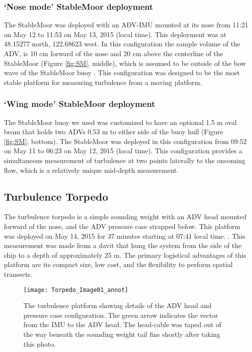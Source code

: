 \subsubsection{`Nose mode' StableMoor deployment}

The StableMoor was deployed with an ADV-IMU mounted at its nose from 11:21 on May 12 to 11:53 on May 13, 2015 (local time). This deployment was at 48.15277 north, 122.68623 west. In this configuration the sample volume of the ADV, is 10 cm forward of the nose and 20 cm above the centerline of the StableMoor (Figure \ref{fig:SM}, middle), which is assumed to be outside of the bow wave of the StableMoor buoy . This configuration was designed to be the most stable platform for measuring turbulence from a moving platform.

\subsubsection{`Wing mode' StableMoor deployment}

The StableMoor buoy we used was customized to have an optional 1.5 m oval beam that holds two ADVs 0.53 m to either side of the buoy hull (Figure \ref{fig:SM}, bottom).  The StableMoor was deployed in this configuration from 09:52 on May 11 to 06:23 on May 12, 2015 (local time). This configuration provides a simultaneous measurement of turbulence at two points laterally to the oncoming flow, which is a relatively unique mid-depth measurement.  

\subsection{Turbulence Torpedo}

The turbulence torpedo is a simple sounding weight with an ADV head mounted forward of the nose, and the ADV pressure case strapped below. This platform was deployed on May 14, 2015 for 37 minutes starting at 07:41 local time. . This measurement was made from a davit that hung the system from the side of the ship to a depth of approximately 25 m. The primary logistical advantages of this platform are its compact size, low cost, and the flexibility to perform spatial transects.  

\begin{figure}[th]
  \centering
  \texttt{[image: Torpedo\_Image01\_annot]}
  \caption{The turbulence platform showing details of the ADV head and pressure case configuration. The green arrow indicates the vector from the IMU to the ADV head. The head-cable was taped out of the way beneath the sounding weight tail fins shortly after taking this photo.}
  \label{fig:torpedo}
\end{figure}

